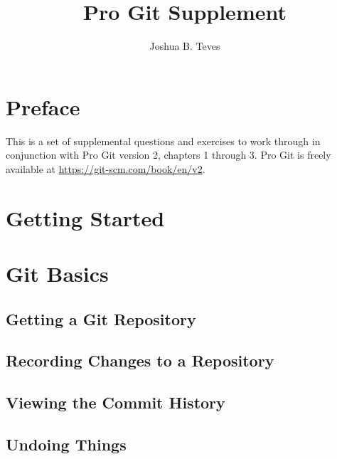 \documentclass{article}
\title{Pro Git Supplement}
\author{Joshua B. Teves}
\begin{document}
\maketitle

\setcounter{tocdepth}{1}
\tableofcontents

\section*{Preface}

\par

This is a set of supplemental questions and exercises to work through in
conjunction with Pro Git version 2, chapters 1 through 3.
Pro Git is freely available at \url{https://git-scm.com/book/en/v2}.

\section{Getting Started}



\section{Git Basics}

\subsection{Getting a Git Repository}



\subsection{Recording Changes to a Repository}



\subsection{Viewing the Commit History}



\subsection{Undoing Things}


\end{document}
